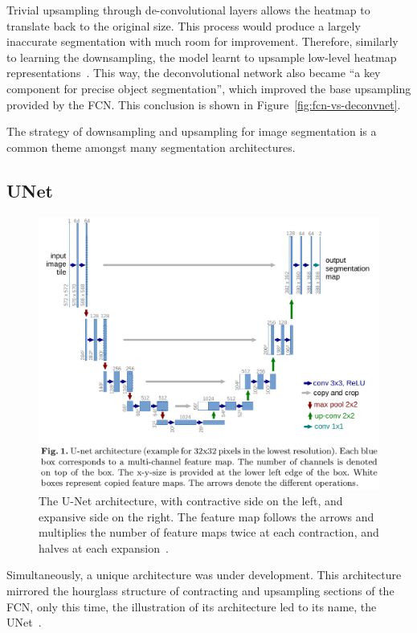 \documentclass[12pt,twoside]{report}
\begin{document}
Trivial upsampling through de-convolutional layers allows the heatmap to translate back to the original size. This process would produce a largely inaccurate segmentation with much room for improvement. Therefore, similarly to learning the downsampling, the model learnt to upsample low-level heatmap representations~\cite{noh2015learning}. This way, the deconvolutional network also became ``a key component for precise object segmentation'', which improved the base upsampling provided by the FCN. This conclusion is shown in Figure~\ref{fig:fcn-vs-deconvnet}.

The strategy of downsampling and upsampling for image segmentation is a common theme amongst many segmentation architectures.

\subsection{UNet}

\begin{figure}[H]
  \centering
  \includegraphics[width=.9\linewidth, trim=0 200px 0 0, clip]{../figures/u-net.png}
  \caption{The U-Net architecture, with contractive side on the left, and expansive side on the right. The feature map follows the arrows and multiplies the number of feature maps twice at each contraction, and halves at each expansion~\cite{U-Net}.}\label{fig:unet}
\end{figure}


Simultaneously, a unique architecture was under development. This architecture mirrored the hourglass structure of contracting and upsampling sections of the FCN, only this time, the illustration of its architecture led to its name, the UNet~\cite{U-Net}.
\end{document}
